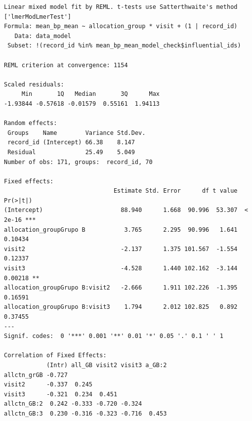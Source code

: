 \documentclass[
  12pt,
]{article}
\newenvironment{Shaded}{\begin{snugshade}}{\end{snugshade}}
\newcommand{\NormalTok}[1]{\textcolor[rgb]{0.00,0.23,0.31}{#1}}
\newcommand{\SpecialCharTok}[1]{\textcolor[rgb]{0.37,0.37,0.37}{#1}}
\begin{document}
\begin{verbatim}
Linear mixed model fit by REML. t-tests use Satterthwaite's method ['lmerModLmerTest']
Formula: mean_bp_mean ~ allocation_group * visit + (1 | record_id)
   Data: data_model
 Subset: !(record_id %in% mean_bp_mean_model_check$influential_ids)

REML criterion at convergence: 1154

Scaled residuals: 
     Min       1Q   Median       3Q      Max 
-1.93844 -0.57618 -0.01579  0.55161  1.94113 

Random effects:
 Groups    Name        Variance Std.Dev.
 record_id (Intercept) 66.38    8.147   
 Residual              25.49    5.049   
Number of obs: 171, groups:  record_id, 70

Fixed effects:
                               Estimate Std. Error      df t value Pr(>|t|)    
(Intercept)                      88.940      1.668  90.996  53.307  < 2e-16 ***
allocation_groupGrupo B           3.765      2.295  90.996   1.641  0.10434    
visit2                           -2.137      1.375 101.567  -1.554  0.12337    
visit3                           -4.528      1.440 102.162  -3.144  0.00218 ** 
allocation_groupGrupo B:visit2   -2.666      1.911 102.226  -1.395  0.16591    
allocation_groupGrupo B:visit3    1.794      2.012 102.825   0.892  0.37455    
---
Signif. codes:  0 '***' 0.001 '**' 0.01 '*' 0.05 '.' 0.1 ' ' 1

Correlation of Fixed Effects:
            (Intr) all_GB visit2 visit3 a_GB:2
allctn_grGB -0.727                            
visit2      -0.337  0.245                     
visit3      -0.321  0.234  0.451              
allctn_GB:2  0.242 -0.333 -0.720 -0.324       
allctn_GB:3  0.230 -0.316 -0.323 -0.716  0.453
\end{verbatim}

\begin{Shaded}
\end{Shaded}
\end{document}
